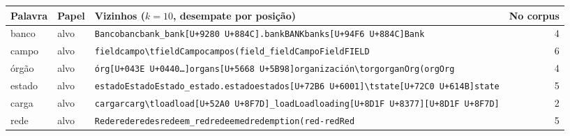 \footnotesize
\setlength{\tabcolsep}{4pt}
\begin{tabularx}{\linewidth}{llXr}
\toprule
Palavra & Papel & Vizinhos ($k=10$, desempate por posição) & No corpus \\
\midrule
banco & alvo & \texttt{\textvisiblespace{}Banco}\enspace \texttt{\textvisiblespace{}banc}\enspace \texttt{\textvisiblespace{}bank}\enspace \texttt{\_bank}\enspace \texttt{[U+9280 U+884C]}\enspace \texttt{.bank}\enspace \texttt{\textvisiblespace{}BANK}\enspace \texttt{\textvisiblespace{}banks}\enspace \texttt{[U+94F6 U+884C]}\enspace \texttt{Bank} & 4 \\
campo & alvo & \texttt{\textvisiblespace{}field}\enspace \texttt{campo}\enspace \texttt{\textbackslash{}tfield}\enspace \texttt{Campo}\enspace \texttt{\textvisiblespace{}campos}\enspace \texttt{(field}\enspace \texttt{\_field}\enspace \texttt{\textvisiblespace{}Campo}\enspace \texttt{\textvisiblespace{}Field}\enspace \texttt{\textvisiblespace{}FIELD} & 6 \\
órgão & alvo & \texttt{\textvisiblespace{}órg}\enspace \texttt{\textvisiblespace{}[U+043E U+0440\ldots{}]}\enspace \texttt{\textvisiblespace{}organs}\enspace \texttt{[U+5668 U+5B98]}\enspace \texttt{\textvisiblespace{}organización}\enspace \texttt{\textbackslash{}torg}\enspace \texttt{\textvisiblespace{}organ}\enspace \texttt{\textvisiblespace{}Org}\enspace \texttt{(org}\enspace \texttt{Org} & 4 \\
estado & alvo & \texttt{estado}\enspace \texttt{Estado}\enspace \texttt{\textvisiblespace{}Estado}\enspace \texttt{\_estado}\enspace \texttt{.estado}\enspace \texttt{\textvisiblespace{}estados}\enspace \texttt{[U+72B6 U+6001]}\enspace \texttt{\textbackslash{}tstate}\enspace \texttt{[U+72C0 U+614B]}\enspace \texttt{\textvisiblespace{}state} & 5 \\
carga & alvo & \texttt{\textvisiblespace{}cargar}\enspace \texttt{\textvisiblespace{}carg}\enspace \texttt{\textbackslash{}tload}\enspace \texttt{\textvisiblespace{}load}\enspace \texttt{[U+52A0 U+8F7D]}\enspace \texttt{\_load}\enspace \texttt{\textvisiblespace{}Load}\enspace \texttt{\textvisiblespace{}loading}\enspace \texttt{[U+8D1F U+8377]}\enspace \texttt{[U+8D1F U+8F7D]} & 2 \\
rede & alvo & \texttt{\textvisiblespace{}Rede}\enspace \texttt{rede}\enspace \texttt{\textvisiblespace{}redes}\enspace \texttt{\textvisiblespace{}redeem}\enspace \texttt{\_red}\enspace \texttt{\textvisiblespace{}redeemed}\enspace \texttt{\textvisiblespace{}redemption}\enspace \texttt{(red}\enspace \texttt{-{}red}\enspace \texttt{Red} & 5 \\

\end{tabularx}
